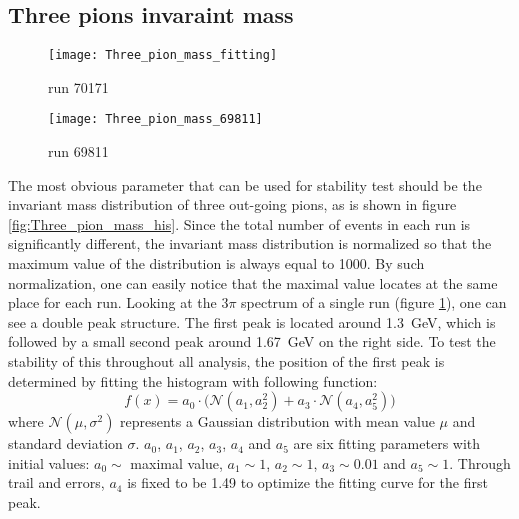 \subsection{Three pions invaraint mass}
\begin{figure*}[t!]
	\centering
	\begin{subfigure}{0.48\textwidth}
		\texttt{[image: Three\_pion\_mass\_fitting]}
		\caption{run 70171}
		\label{fig:Three_pion_mass_fitting}
	\end{subfigure}
	\begin{subfigure}{0.48\textwidth}
		\texttt{[image: Three\_pion\_mass\_69811]}
		\caption{run 69811}
		\label{fig:Three_pion_mass_69811}
	\end{subfigure}
	\caption{Three pion invariant mass distribution and their corresponding fit result. The fit range corresponds to \SI{30}{\percent} of of maximal value of the distribution. (a) Distribution of a normal run. The first peak (primary) locates at around \SI{1.3}{\giga\electronvolt}. The red curve matches data well  around the primary peak, but poorly around the second peak. (b) Distribution of an abnormal run. No second peak can be found on the right side of primary peak. Parameter $a_1$ is fitted to be \SI{1.034}{\giga\electronvolt}, which is slightly larger than a usual value due to the bad fit. }
	\label{fig:pion_mass}
\end{figure*}
The most obvious parameter that can be used for stability test should be the invariant mass distribution of three out-going pions, as is shown in figure \ref{fig:Three_pion_mass_his}. Since the total number of events in each run is significantly different, the invariant mass distribution is normalized so that the maximum value of the distribution is always equal to 1000. By such normalization, one can easily notice that the maximal value locates at the same place for each run. Looking at the $3\pi$ spectrum of a single run (figure \ref{fig:Three_pion_mass_fitting}), one can see a double peak structure. The first peak is located around \SI{1.3}{\giga\electronvolt}, which is followed by a small second peak around \SI{1.67}{\giga\electronvolt} on the right side. To test the stability of this throughout all analysis, the position of the first peak is determined by fitting the histogram with following function:
\begin{equation}
f(x) = a_0 \cdot \Big(\mathcal{N}(a_1, a_2^2)+a_3 \cdot \mathcal{N}(a_4, a_5^2)\Big)
\end{equation}
where $\mathcal{N}(\mu,\sigma^2)$ represents a Gaussian distribution with mean value $\mu$ and standard deviation $\sigma$. $a_0$, $a_1$, $a_2$, $a_3$, $a_4$ and $a_5$ are six fitting parameters with initial values: $a_0 \sim$ maximal value, $a_1 \sim 1$, $a_2 \sim 1$, $a_3 \sim 0.01$ and $a_5 \sim 1$. Through trail and errors, $a_4$ is fixed to be 1.49 to optimize the fitting curve for the first peak.

